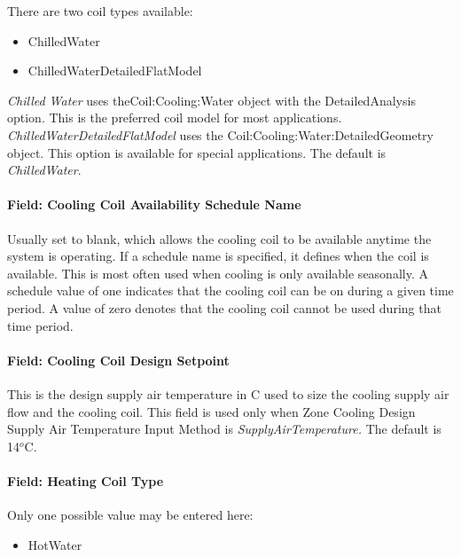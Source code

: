 There are two coil types available:

\begin{itemize}
\item
  ChilledWater
\item
  ChilledWaterDetailedFlatModel
\end{itemize}

\emph{Chilled Water} uses theCoil:Cooling:Water object with the DetailedAnalysis option. This is the preferred coil model for most applications. \emph{ChilledWaterDetailedFlatModel} uses the Coil:Cooling:Water:DetailedGeometry object. This option is available for special applications. The default is \emph{ChilledWater}.

\paragraph{Field: Cooling Coil Availability Schedule Name}\label{field-cooling-coil-availability-schedule-name}

Usually set to blank, which allows the cooling coil to be available anytime the system is operating. If a schedule name is specified, it defines when the coil is available. This is most often used when cooling is only available seasonally. A schedule value of one indicates that the cooling coil can be on during a given time period. A value of zero denotes that the cooling coil cannot be used during that time period.

\paragraph{Field: Cooling Coil Design Setpoint}\label{field-cooling-coil-design-setpoint}

This is the design supply air temperature in C used to size the cooling supply air flow and the cooling coil. This field is used only when Zone Cooling Design Supply Air Temperature Input Method is \emph{SupplyAirTemperature.} The default is 14\(^{o}\)C.

\paragraph{Field: Heating Coil Type}\label{field-heating-coil-type}

Only one possible value may be entered here:

\begin{itemize}
\tightlist
\item
  HotWater
\end{itemize}

